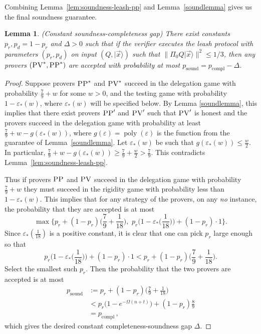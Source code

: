 \documentclass[11pt,letter]{article}
\newtheorem{lemma}[theorem]{Lemma}
\theoremstyle{remark}
\theoremstyle{definition}
\newcommand{\ket}[1]{|#1\rangle}
\DeclareMathOperator{\poly}{poly}
\newcommand{\eps}{\varepsilon}
\newcommand{\pv}{\textsc{PV}}
\newcommand{\pp}{\textsc{PP}}
\begin{document}
Combining Lemma~\ref{lem:soundness-leash-pp} and Lemma~\ref{soundlemma} gives us the final soundness guarantee.

\begin{lemma}\label{lem:leash-soundness} (Constant soundness-completeness gap)
There exist constants $p_r,p_d=1-p_r$ and $\Delta>0$ such that if the verifier executes the leash protocol with parameters $(p_r,p_d)$ on input $(Q,\ket{\vec{x}})$ such that $\|\Pi_0 Q\ket{\vec{x}}\|^2 \leq 1/3$, then any provers $(\pv^*,\pp^*)$ are accepted with probability at most $p_{\mathrm{sound}}=p_{\mathrm{compl}}-\Delta$.  
\end{lemma}

\begin{proof}
Suppose provers $\pp^*$ and $\pv^*$ succeed in the delegation game with probability $\frac79+w$ for some $w>0$, and the testing game with probability $1-\eps_*(w)$, where $\eps_*(w)$ will be specified below. By Lemma \ref{soundlemma}, this implies that there exist provers $\pp'$ and $\pv'$ such that $\pv'$ is honest and the provers succeed in the delegation game with probability at least $\frac79+w-g(\eps_*(w))$, where $g(\eps) = \poly(\eps)$ is the function from the guarantee of Lemma~\ref{soundlemma}. Let $\eps_*(w)$ be such that $g(\eps_*(w)) \leq \frac{w}{2}$. In particular, $\frac79+w-g(\eps_*(w)) \geq \frac79+\frac{w}{2}>\frac79$. This contradicts Lemma~\ref{lem:soundness-leash-pp}. 

Thus if provers $\pp$ and $\pv$ succeed in the delegation game with probability $\frac79+w$ they must succeed in the rigidity game with probability less than $1-\eps_*(w)$. 
This implies that for any strategy of the provers, on any \textit{no} instance, the probability that they are accepted is at most
\begin{equation}
\max\Big\{p_r+(1-p_r)\Big(\frac79+\frac{1}{18}\Big),\,\, p_r\Big(1-\eps_*\Big(\frac{1}{18}\Big)\Big)+(1-p_r)\cdot 1\Big\}.
\end{equation}
Since $\eps_*(\frac{1}{18})$ is a positive constant, it is clear that one can pick $p_r$ large enough so that 
\begin{equation}
p_r\Big(1-\eps_*\Big(\frac{1}{18}\Big)\Big)+(1-p_r)\cdot 1 < p_r+(1-p_r)\Big(\frac79+\frac{1}{18}\Big).
\end{equation}
Select the smallest such $p_r$. Then the probability that the two provers are accepted is at most 
\begin{align*}
p_{\mathrm{sound}} &:= p_r+(1-p_r)\Big(\frac79+\frac{1}{18}\Big)\\
&< p_r\big(1-e^{-\Omega(n+t)}\big)+(1-p_r)\frac89 \\
&= p_{\mathrm{compl}} \,,
\end{align*}
which gives the desired constant completeness-soundness gap $\Delta$.
\end{proof}
\end{document}

